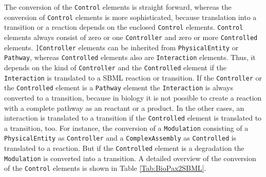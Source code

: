\documentclass{bioinfo}
\begin{document}
\begin{methods}
The conversion of the \texttt{Control} elements is straight forward, whereas the conversion of \texttt{Control} elements is more sophisticated, because translation into a transition or a reaction depends on the enclosed \texttt{Control} elements.
\texttt{Control} elements always consist of zero or one \texttt{Controller} and zero or more \texttt{Controlled} elements. 
\texttt{]Controller} elements can be inherited from \texttt{PhysicalEntity} or \texttt{Pathway}, whereas \texttt{Controlled} elements also are \texttt{Interaction} elements.
Thus, it depends on the kind of \texttt{Controller} and the \texttt{Controlled} element if the \texttt{Interaction} is translated to a SBML reaction or transition.
If the \texttt{Controller} or the \texttt{Controlled} element is a \texttt{Pathway} element the \texttt{Interaction} is always converted to a transition, because in biology it is not possible to create a reaction with a complete pathway as an reactant or a product.
In the other cases, an interaction is translated to a transition if the \texttt{Controlled} element is translated to a transition, too. 
For instance, the conversion of a \texttt{Modulation} consisting of a \texttt{PhysicalEntity} as \texttt{Controller} and a \texttt{ComplexAssembly} as \texttt{Controlled} is translated to a reaction.
But if the \texttt{Controlled} element is a degradation the \texttt{Modulation} is converted into a transition. 
A detailed overview of the conversion of the \texttt{Control} elements is shown in Table \ref{Tab:BioPax2SBML}.


\end{methods}
\end{document}
